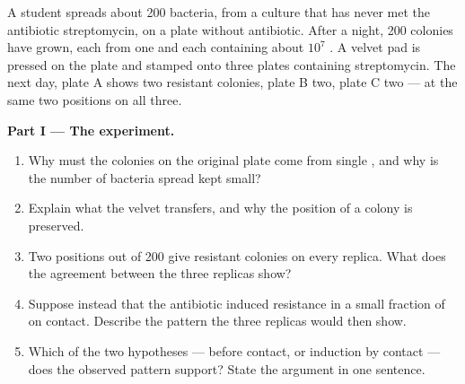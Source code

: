 \begin{problem}
\label{pb:g11:mutations:1}
A student spreads about 200 bacteria, from a culture that has never met
the antibiotic streptomycin, on a plate without antibiotic. After a
night, 200 colonies have grown, each from one  and each containing
about $10^7$ . A velvet pad is pressed on the plate and stamped
onto three plates containing streptomycin. The next day, plate A shows
two resistant colonies, plate B two, plate C two --- at the same two
positions on all three.

\medskip
\noindent\textbf{Part I --- The experiment.}
\begin{enumerate}
  \item Why must the colonies on the original plate come from single
        , and why is the number of bacteria spread kept small?
  \item Explain what the velvet transfers, and why the position of a
        colony is preserved.
  \item Two positions out of 200 give resistant colonies on every
        replica. What does the agreement between the three replicas
        show?
  \item Suppose instead that the antibiotic induced resistance in a
        small fraction of  on contact. Describe the pattern the
        three replicas would then show.
  \item Which of the two hypotheses ---  before contact, or
        induction by contact --- does the observed pattern support?
        State the argument in one sentence.
\end{enumerate}


\end{problem}
